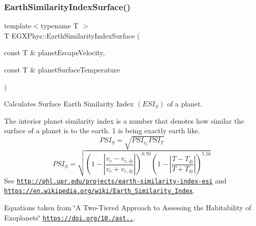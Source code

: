 \subsubsection{\texorpdfstring{Earth\+Similarity\+Index\+Surface()}{EarthSimilarityIndexSurface()}}
{\footnotesize\ttfamily template$<$typename T $>$ \\
T E\+G\+X\+Phys\+::\+Earth\+Similarity\+Index\+Surface (\begin{DoxyParamCaption}\item[{const T \&}]{planet\+Escape\+Velocity,  }\item[{const T \&}]{planet\+Surface\+Temperature }\end{DoxyParamCaption})}



Calculates Surface Earth Similarity Index $(ESI_S)$ of a planet. 

The interior planet similarity index is a number that denotes how similar the surface of a planet is to the earth. 1 is being exactly earth like. \[PSI_S=\sqrt{PSI_{v_e} PSI_T}\] \[PSI_S=\sqrt{\left ( 1 - \left | \frac{v_e-v_{e,\oplus}}{v_e+v_{e,\oplus}} \right | \right )^{0.70} \left ( 1 - \left | \frac{T-T_{\oplus}}{T+T_{\oplus}} \right | \right )^{5.58}}\] See \href{http://phl.upr.edu/projects/earth-similarity-index-esi}{\tt http\+://phl.\+upr.\+edu/projects/earth-\/similarity-\/index-\/esi} and \href{https://en.wikipedia.org/wiki/Earth_Similarity_Index}{\tt https\+://en.\+wikipedia.\+org/wiki/\+Earth\+\_\+\+Similarity\+\_\+\+Index}.

Equations taken from \char`\"{}\+A Two-\/\+Tiered Approach to Assessing the Habitability of Exoplanets\char`\"{} \href{https://doi.org/10.1089/ast.2010.0592}{\tt https\+://doi.\+org/10./ast..}.


